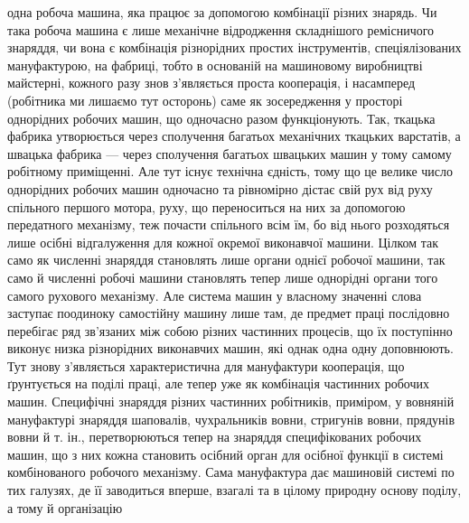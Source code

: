 \parcont{}  %
одна робоча машина, яка працює за допомогою комбінації різних
знарядь. Чи така робоча машина є лише механічне відродження
складнішого ремісничого знаряддя, чи вона є комбінація різнорідних
простих інструментів, спеціялізованих мануфактурою, на
фабриці, тобто в основаній на машиновому виробництві майстерні,
кожного разу знов з’являється проста кооперація, і насамперед
(робітника ми лишаємо тут осторонь) саме як зосередження у просторі
однорідних робочих машин, що одночасно разом функціонують.
Так, ткацька фабрика утворюється через сполучення
багатьох механічних ткацьких варстатів, а швацька фабрика —
через сполучення багатьох швацьких машин у тому самому робітному
приміщенні. Але тут існує технічна єдність, тому що це
велике число однорідних робочих машин одночасно та рівномірно
дістає свій рух від руху спільного першого мотора, руху, що
переноситься на них за допомогою передатного механізму, теж
почасти спільного всім їм, бо від нього розходяться лише осібні
відгалуження для кожної окремої виконавчої машини. Цілком
так само як численні знаряддя становлять лише органи однієї
робочої машини, так само й численні робочі машини становлять
тепер лише однорідні органи того самого рухового механізму.
Але система машин у власному значенні слова заступає
поодиноку самостійну машину лише там, де предмет праці послідовно
перебігає ряд зв’язаних між собою різних частинних
процесів, що їх поступінно виконує низка різнорідних виконавчих
машин, які однак одна одну доповнюють. Тут знову з’являється
характеристична для мануфактури кооперація, що ґрунтується
на поділі праці, але тепер уже як комбінація частинних
робочих машин. Специфічні знаряддя різних частинних робітників,
приміром, у вовняній мануфактурі знаряддя шаповалів,
чухральників вовни, стригунів вовни, прядунів вовни й т. ін.,
перетворюються тепер на знаряддя специфікованих робочих машин,
що з них кожна становить осібний орган для осібної функції
в системі комбінованого робочого механізму. Сама мануфактура
дає машиновій системі по тих галузях, де її заводиться вперше,
взагалі та в цілому природну основу поділу, а тому й організацію
